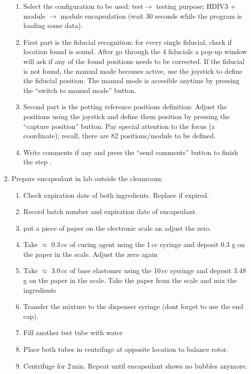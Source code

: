 \documentclass[12pt]{unlsilabsop}
\begin{document}
\begin{enumerate}
    \begin{enumerate}
    \item Select the configuration to be used: test$\to$ testing purpose; HDIV3 + module $\to$ module encapsulation (wait 30 seconds while the program is loading some data). 
    \item First part is the fiducial recognition: for every single fiducial, check if location found is sound. After go through the 4 fiducials a pop-up window will ask if any of the found positions needs to be corrected. If the fiducial is not found, the manual mode becomes active, use the joystick to define the fiducial position. The manual mode is accesible anytime by pressing the ``switch to manual mode'' button.   
    \item Second part is the potting reference positions definition: Adjust the positions using the joystick and define them position by pressing the ``capture position'' button. Pay special attention to the focus (z coordinate); recall, there are 82 positions/module to be defined. 
    \item Write comments if any and press the ``send comments'' button to finish the step .
    \end{enumerate}
  \item Prepare encapsulant in lab outside the cleanroom:\label{enum:prepencapsulant}
    \begin{enumerate}
        \item Check expiration date of both ingredients. Replace if expired.
	\item Record batch number and expiration date of encapsulant.
        \item put a piece of paper on the electronic scale an adjust the zero.
	\item Take $\approx$ 0.3\,cc of curing agent using the 1\,cc syringe and deposit 0.3 g on the paper in the scale. Adjust the zero again 
        \item Take $\approx$ 3.0\,cc of base elastomer using the 10\,cc sysringe and deposit 3.48 g on the paper in the scale. Take the paper from the scale and mix the ingredients
        \item Transfer the mixture to the dispenser syringe (dont forget to use the end cap).  
	\item Fill another test tube with water
	\item Place both tubes in centrifuge at opposite location to balance rotor.
	\item Centrifuge for 2\,min. Repeat until encapsulant shows no bubbles anymore.

\end{enumerate}
\end{enumerate}
\end{document}
